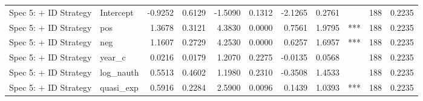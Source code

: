 \begin{tabular}{llrrrrrrlrr}
Spec 5: + ID Strategy & Intercept & -0.9252 & 0.6129 & -1.5090 & 0.1312 & -2.1265 & 0.2761 &  & 188 & 0.2235 \\
Spec 5: + ID Strategy & pos & 1.3678 & 0.3121 & 4.3830 & 0.0000 & 0.7561 & 1.9795 & *** & 188 & 0.2235 \\
Spec 5: + ID Strategy & neg & 1.1607 & 0.2729 & 4.2530 & 0.0000 & 0.6257 & 1.6957 & *** & 188 & 0.2235 \\
Spec 5: + ID Strategy & year_c & 0.0216 & 0.0179 & 1.2070 & 0.2275 & -0.0135 & 0.0568 &  & 188 & 0.2235 \\
Spec 5: + ID Strategy & log_nauth & 0.5513 & 0.4602 & 1.1980 & 0.2310 & -0.3508 & 1.4533 &  & 188 & 0.2235 \\
Spec 5: + ID Strategy & quasi_exp & 0.5916 & 0.2284 & 2.5900 & 0.0096 & 0.1439 & 1.0393 & *** & 188 & 0.2235 \\
\bottomrule
\end{tabular}
